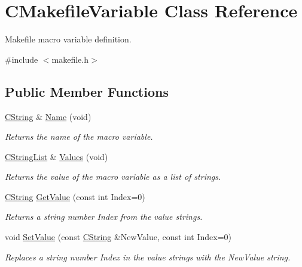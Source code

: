 \hypertarget{classCMakefileVariable}{\section{C\-Makefile\-Variable Class Reference}
\label{classCMakefileVariable}
}


Makefile macro variable definition.  




{\ttfamily \#include $<$makefile.\-h$>$}

\subsection*{Public Member Functions}
\begin{DoxyCompactItemize}
\item 
\hyperlink{classCString}{C\-String} \& \hyperlink{classCMakefileVariable_aa8b16026f63f5293f70d03cb3b2a3f44}{Name} (void)
\begin{DoxyCompactList}\small\item\em Returns the name of the macro variable. \end{DoxyCompactList}\item 
\hyperlink{classCStringList}{C\-String\-List} \& \hyperlink{classCMakefileVariable_afd4cc467a611ed20b71cc3751b6af6f6}{Values} (void)
\begin{DoxyCompactList}\small\item\em Returns the value of the macro variable as a list of strings. \end{DoxyCompactList}\item 
\hyperlink{classCString}{C\-String} \hyperlink{classCMakefileVariable_a142ae75dbbb66bc8cc8ff022191588bd}{Get\-Value} (const int Index=0)
\begin{DoxyCompactList}\small\item\em Returns a string number {\itshape Index} from the value strings. \end{DoxyCompactList}\item 
void \hyperlink{classCMakefileVariable_a447d1ace1f70fc69da0bb5f5fc214b21}{Set\-Value} (const \hyperlink{classCString}{C\-String} \&New\-Value, const int Index=0)
\begin{DoxyCompactList}\small\item\em Replaces a string number {\itshape Index} in the value strings with the {\itshape New\-Value} string. \end{DoxyCompactList}\item 

\end{DoxyCompactItemize}

